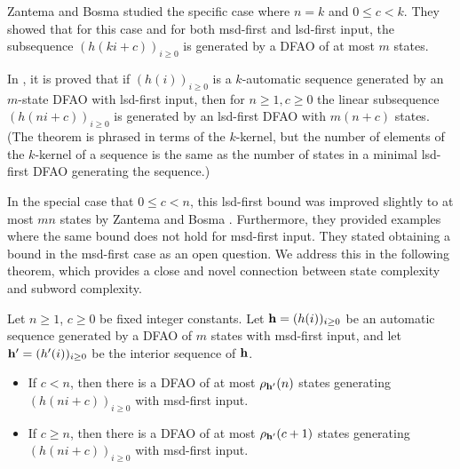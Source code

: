 \documentclass[12pt,reqno]{article}
\begin{document}
Zantema and Bosma \cite{zantema_complexity_2022} studied the specific case
where $n = k$ and $0 \leq c < k$.  They showed that for this case and for both msd-first and lsd-first input, the subsequence $(h(ki+c))_{i \geq 0}$ is generated by a DFAO of at most $m$ states.

In \cite[Proof of Theorem 6.8.1]{allouche_automatic_2003}, it is proved that if $(h(i))_{i \geq 0}$ is a $k$-automatic
sequence generated by an $m$-state DFAO with lsd-first input, then for $n \geq 1, c \geq0$ the linear subsequence $(h(ni+c))_{i \geq 0}$ is generated by an lsd-first DFAO with
$m(n+c)$ states.  (The theorem is phrased in terms of the $k$-kernel, but
the number of elements of the $k$-kernel of a sequence is the same as the number of states in a minimal lsd-first DFAO generating the sequence.)

In the special case that $0 \leq c < n$, this lsd-first bound was improved slightly to at most $mn$ states by
Zantema and Bosma \cite{zantema_complexity_2022}.
Furthermore, they provided examples where the same bound does not hold for msd-first input. They stated obtaining a bound in the msd-first case as an open question.  We address this in the following theorem, which provides a close and novel connection between state complexity and subword complexity.

\begin{theorem}\label{theorem:h(ni+c)-msd-sc}
Let $n \geq 1$, $c \geq 0$ be fixed integer constants.
Let ${\bf h} = (h(i))_{i \geq 0}$ be an automatic sequence generated by a DFAO of $m$ states with msd-first input, and let
${\bf h}' = (h'(i))_{i \geq 0}$ be the
interior sequence of $\bf h$.
\begin{itemize}
    \item[(a)] If $c < n$, then there is a DFAO of at most 
    $\rho_{{\bf h}'} (n)$ states
    generating $(h(ni+c))_{i \geq 0}$ with msd-first input.

    \item[(b)] If $c \geq n$, then there is a DFAO of at most
    $\rho_{{\bf h}'} (c+1)$ states
    generating $(h(ni+c))_{i \geq 0}$ with msd-first input.
    \end{itemize}
\end{theorem}
\end{document}
